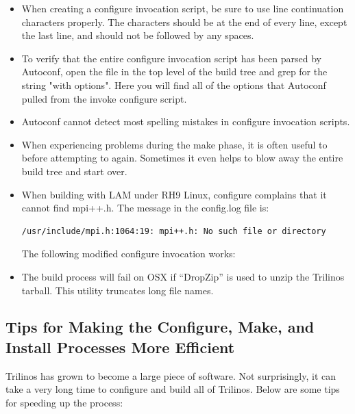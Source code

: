 \begin{itemize}
\item When creating a configure invocation script, be sure to use
line continuation characters properly.  The characters should be at the
end of every line, except the last line, and should not be followed by any
spaces.
                                                                                
\item To verify that the entire configure invocation script has been parsed by
Autoconf, open the  file in the top level of
the build tree and grep for the string "with options".  Here you will find all
of the options that Autoconf pulled from the invoke configure script.
                                                                                
\item Autoconf cannot detect most
spelling mistakes in configure invocation scripts.

\item When experiencing problems during the make phase, it is often useful to
 before attempting to  again.
Sometimes it even helps to blow away the entire build tree and start over.
                                                                                
\item When building with LAM under RH9 Linux, configure complains that it
cannot find mpi++.h.  The message in the config.log file is:
\begin{verbatim}
/usr/include/mpi.h:1064:19: mpi++.h: No such file or directory
\end{verbatim}
The following modified configure invocation works:
                                                                                
\item The build process will fail on OSX if ``DropZip'' is used to
unzip the Trilinos tarball.  This utility truncates long file names.

\end{itemize}

\subsection{Tips for Making the Configure, Make, and Install Processes More Efficient}

Trilinos has grown to become a large piece of software.  Not surprisingly,
it can take a very long time to configure and build all of Trilinos.  Below 
are some tips for speeding up the process:

